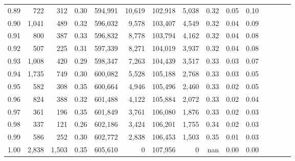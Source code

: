 \begin{tabular}{rrrcrrrrrrrrrrr}
0.89 &     722 &    312 &                                       0.30 &  594,991 &   10,619 &  102,918 &    5,038 &  0.32 &  0.05 &                         0.10 \\
0.90 &   1,041 &    489 &                                       0.32 &  596,032 &    9,578 &  103,407 &    4,549 &  0.32 &  0.04 &                         0.09 \\
0.91 &     800 &    387 &                                       0.33 &  596,832 &    8,778 &  103,794 &    4,162 &  0.32 &  0.04 &                         0.08 \\
0.92 &     507 &    225 &                                       0.31 &  597,339 &    8,271 &  104,019 &    3,937 &  0.32 &  0.04 &                         0.08 \\
0.93 &   1,008 &    420 &                                       0.29 &  598,347 &    7,263 &  104,439 &    3,517 &  0.33 &  0.03 &                         0.07 \\
0.94 &   1,735 &    749 &                                       0.30 &  600,082 &    5,528 &  105,188 &    2,768 &  0.33 &  0.03 &                         0.05 \\
0.95 &     582 &    308 &                                       0.35 &  600,664 &    4,946 &  105,496 &    2,460 &  0.33 &  0.02 &                         0.05 \\
0.96 &     824 &    388 &                                       0.32 &  601,488 &    4,122 &  105,884 &    2,072 &  0.33 &  0.02 &                         0.04 \\
0.97 &     361 &    196 &                                       0.35 &  601,849 &    3,761 &  106,080 &    1,876 &  0.33 &  0.02 &                         0.03 \\
0.98 &     337 &    121 &                                       0.26 &  602,186 &    3,424 &  106,201 &    1,755 &  0.34 &  0.02 &                         0.03 \\
0.99 &     586 &    252 &                                       0.30 &  602,772 &    2,838 &  106,453 &    1,503 &  0.35 &  0.01 &                         0.03 \\
1.00 &   2,838 &  1,503 &                                       0.35 &  605,610 &        0 &  107,956 &        0 &   nan &  0.00 &                         0.00 \\
\bottomrule
\end{tabular}
